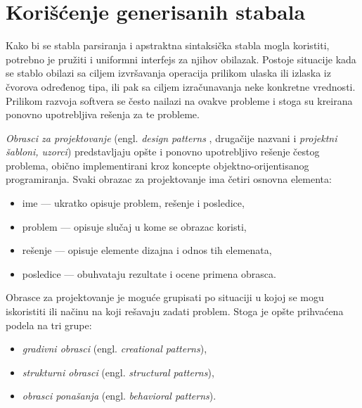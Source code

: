 \section{Korišćenje generisanih stabala}
\label{sec:DesignPatterns}

Kako bi se stabla parsiranja i apstraktna sintaksička stabla mogla koristiti, potrebno je pružiti i uniformni interfejs za njihov obilazak. Postoje situacije kada se stablo obilazi sa ciljem izvršavanja operacija prilikom ulaska ili izlaska iz čvorova određenog tipa, ili pak sa ciljem izračunavanja neke konkretne vrednosti. Prilikom razvoja softvera se često nailazi na ovakve probleme i stoga su kreirana ponovno upotrebljiva rešenja za te probleme. 

\emph{Obrasci za projektovanje} (engl. \emph{design patterns} \cite{DesignPatterns}, drugačije nazvani i \emph{projektni šabloni, uzorci}) predstavljaju opšte i ponovno upotrebljivo rešenje čestog problema, obično implementirani kroz koncepte objektno-orijentisanog programiranja. Svaki obrazac za projektovanje ima četiri osnovna elementa:
\begin{itemize}
    \item ime --- ukratko opisuje problem, rešenje i posledice,
    \item problem --- opisuje slučaj u kome se obrazac koristi,
    \item rešenje --- opisuje elemente dizajna i odnos tih elemenata,
    \item posledice --- obuhvataju rezultate i ocene primena obrasca.
\end{itemize}

Obrasce za projektovanje je moguće grupisati po situaciji u kojoj se mogu iskoristiti ili načinu na koji rešavaju zadati problem. Stoga je opšte prihvaćena podela na tri grupe:
\begin{itemize}
    \item \emph{gradivni obrasci} (engl. \emph{creational patterns}),
    \item \emph{strukturni obrasci} (engl. \emph{structural patterns}),
    \item \emph{obrasci ponašanja} (engl. \emph{behavioral patterns}).
\end{itemize}

